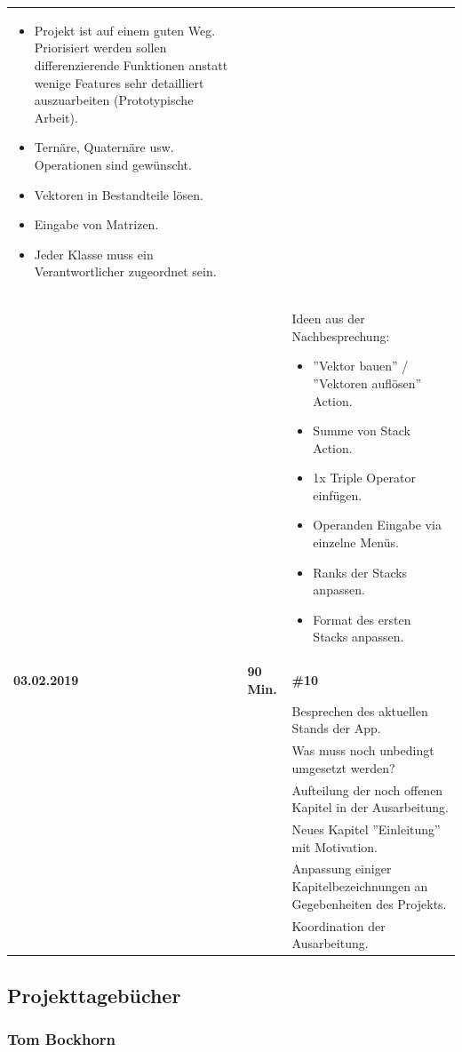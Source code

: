 {\begin{longtable}{|l|l|p{11cm}|}
\begin{itemize}
				\item Projekt ist auf einem guten Weg. Priorisiert werden sollen differenzierende Funktionen anstatt wenige Features sehr detailliert auszuarbeiten (Prototypische Arbeit).
				\item Ternäre, Quaternäre usw. Operationen sind gewünscht.
				\item Vektoren in Bestandteile lösen.
				\item Eingabe von Matrizen.
				\item Jeder Klasse muss ein Verantwortlicher zugeordnet sein.
			\end{itemize}
			\\ & &
			Ideen aus der Nachbesprechung:

			\begin{itemize}\renewcommand\labelitemi{--}
				\item ''Vektor bauen'' / ''Vektoren auflösen'' Action. 
				\item Summe von Stack Action.
				\item 1x Triple Operator einfügen.
				\item Operanden Eingabe via einzelne Menüs.
				\item Ranks der Stacks anpassen.
				\item Format des ersten Stacks anpassen.
			\end{itemize}
	\\ \hline
		\textbf{03.02.2019} & \textbf{90 Min.} &
			\textbf{\#10}
			\\ & &
			Besprechen des aktuellen Stands der App.
			\\ & &
			Was muss noch unbedingt umgesetzt werden?
			\\ & &
			Aufteilung der noch offenen Kapitel in der Ausarbeitung.
			\\ & &
			Neues Kapitel ''Einleitung'' mit Motivation.
			\\ & &
			Anpassung einiger Kapitelbezeichnungen an Gegebenheiten des Projekts.
			\\ & &
			Koordination der Ausarbeitung.
	\\
\end{longtable}
}

\subsection{Projekttagebücher}

\subsubsection{Tom Bockhorn}


